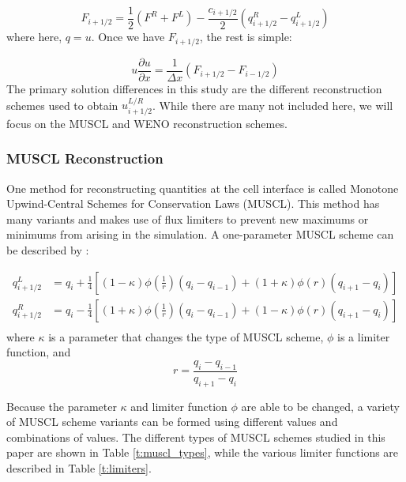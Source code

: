 \documentclass[conf]{new-aiaa}
\begin{document}
\begin{equation}
	F_{i+1/2} = \frac{1}{2} \left( F^R + F^L \right) - \frac{c_{i+1/2}}{2}
	\left( q_{i+1/2}^R - q_{i+1/2}^L \right)
\end{equation}
where here, $q=u$.  Once we have $F_{i+1/2}$, the rest is simple:

\begin{equation}
	u \frac{\partial u}{\partial x} = \frac{1}{\Delta x} \left( F_{i+1/2} -
		F_{i-1/2} \right)
\end{equation}
The primary solution differences in this study are the different reconstruction
schemes used to obtain $u_{i+1/2}^{L/R}$. While there are many not included
here, we will focus on the MUSCL and WENO reconstruction schemes.

\subsubsection{MUSCL Reconstruction}
One method for reconstructing quantities at the cell interface is called
Monotone Upwind-Central Schemes for Conservation Laws (MUSCL). This method has
many variants and makes use of flux limiters to prevent new maximums or
minimums from arising in the simulation. A one-parameter MUSCL scheme can be
described by \cite{san2014numerical}:

\begin{equation}
	\begin{aligned}
		q_{i+1/2}^L &= q_i + \frac{1}{4} \left[
			(1-\kappa) \phi \left( \frac{1}{r} \right) (q_i - q_{i-1}) +
			(1+\kappa) \phi(r) (q_{i+1} - q_i)
		\right] \\
		q_{i+1/2}^R &= q_i - \frac{1}{4} \left[
			(1+\kappa) \phi \left( \frac{1}{r} \right) (q_i - q_{i-1}) +
			(1-\kappa) \phi(r) (q_{i+1} - q_i)
		\right] \\
	\end{aligned}
\end{equation}
where $\kappa$ is a parameter that changes the type of MUSCL scheme, $\phi$ is
a limiter function, and
\[
	r = \frac{q_i - q_{i-1}}{q_{i+1} - q_i}
\]

Because the parameter $\kappa$ and limiter function $\phi$ are able to be
changed, a variety of MUSCL scheme variants can be formed using different
values and combinations of values. The different types of MUSCL schemes studied
in this paper are shown in Table \ref{t:muscl_types}, while the various limiter
functions are described in Table \ref{t:limiters}.
\end{document}
